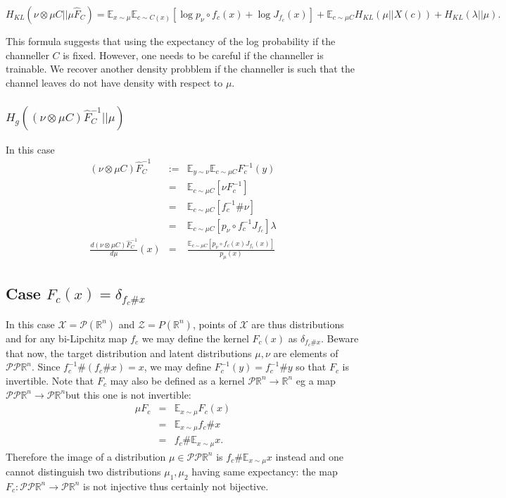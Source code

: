 \documentclass[a4paper,10pt]{article}
\def\X{\mathcal{X}}
\def\Z{\mathcal{Z}}
\def\P{\mathcal{P}}
\def\RR{\mathbb{R}}
\def\EE{\mathbb{E}}
\begin{document}
$$ H_{KL}( \nu\otimes \mu C || \mu \widehat F_C )  = \EE_{x\sim \mu} \EE_{c\sim C(x)} \left[ \log p_\nu \circ f_c(x) +\log J_{f_c}(x) \right] + \EE_{c\sim \mu C} H_{KL}(\mu||X(c)) + H_{KL}(\lambda||\mu)  .$$



This formula suggests that using the expectancy of the log probability if the channeller $C$ is fixed. However, one needs to be careful if the channeller is trainable.
We recover another density probblem if the channeller is such that the channel leaves do not have density with respect to $\mu$.

\subsubsection{$H_g( (\nu \otimes \mu C) \widehat F_C^{-1}|| \mu )$}
In this case
\begin{eqnarray}
 (\nu\otimes \mu C) \widehat F_C^{-1} &:=&  \EE_{y\sim \nu} \EE_{c\sim \mu C} F_c^{-1}(y) \\
 &=&  \EE_{c\sim \mu C} \left[\nu F_c^{-1}\right] \\
 &=& \EE_{c\sim \mu C} \left[f_c^{-1}\# \nu \right] \\
 &=& \EE_{c\sim \mu C} \left[ p_{\nu}\circ f_c^{-1} J_{f_c} \right] \lambda \\
 \frac{d(\nu\otimes \mu C) \widehat F_C^{-1}}{d \mu}(x) &=& \frac{\EE_{c\sim \mu C} \left[ p_{\nu}\circ f_c(x) J_{f_c}(x) \right]}{p_\mu(x)}
\end{eqnarray}


\subsection{Case $F_c(x) = \delta_{f_c \# x}$}
In this case $\X = \mathcal P(\RR^n)$ and $\Z = P(\RR^n)$, points of $\X$ are thus distributions and for any bi-Lipchitz map $f_c$ we may define the kernel $F_c(x)$ as $ \delta_{f_c\#  x}$.
Beware that now, the target distribution and latent distributions $\mu,\nu$ are elements of $\mathcal P \mathcal P\RR^n$.
Since $f_c^{-1}\# (f_c \# x) = x$, we may define $F_c^{-1}(y) = f_c^{-1}\# y$ so that $F_c$ is invertible.
Note that $F_c$ may also be defined as a kernel  $\mathcal P\RR^n \rightarrow \RR^n$ eg a map $\P\P\RR^n\rightarrow \P\RR^n$but this one is not invertible:
\begin{eqnarray}
\mu F_c &=& \EE_{x\sim \mu}F_c(x) \\
&=& \EE_{x\sim \mu} f_c\# x \\
&=& f_c\# \EE_{x\sim \mu}x.
\end{eqnarray}
Therefore the image of a distribution $\mu \in \mathcal P \mathcal P\RR^n $ is $f_c \# \EE_{x\sim \mu}x$ instead and one cannot distinguish two distributions $\mu_1,\mu_2$ having same expectancy: the map
$F_c : \mathcal P \mathcal P\RR^n \rightarrow \mathcal P\RR^n $ is not injective thus certainly not bijective.
\end{document}
